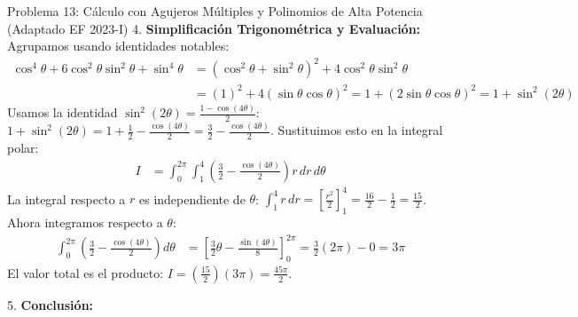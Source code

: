 \documentclass[11pt,a4paper]{article}
\begin{document}
\begin{ejerciciobox}{Problema 13: Cálculo con Agujeros Múltiples y Polinomios de Alta Potencia (Adaptado EF 2023-I)}
4. \textbf{Simplificación Trigonométrica y Evaluación:}
Agrupamos usando identidades notables:
\begin{align*}
\cos^4\theta + 6\cos^2\theta\sin^2\theta + \sin^4\theta &= (\cos^2\theta + \sin^2\theta)^2 + 4\cos^2\theta\sin^2\theta \\
&= (1)^2 + 4(\sin\theta\cos\theta)^2 = 1 + (2\sin\theta\cos\theta)^2 = 1 + \sin^2(2\theta)
\end{align*}
Usamos la identidad $\sin^2(2\theta) = \frac{1 - \cos(4\theta)}{2}$:
$1 + \sin^2(2\theta) = 1 + \frac{1}{2} - \frac{\cos(4\theta)}{2} = \frac{3}{2} - \frac{\cos(4\theta)}{2}$.
Sustituimos esto en la integral polar:
\begin{align*}
I &= \int_0^{2\pi} \int_1^4 \left( \frac{3}{2} - \frac{\cos(4\theta)}{2} \right) r \, dr \, d\theta
\end{align*}
La integral respecto a $r$ es independiente de $\theta$:
$\int_1^4 r \, dr = \left[ \frac{r^2}{2} \right]_1^4 = \frac{16}{2} - \frac{1}{2} = \frac{15}{2}$.
Ahora integramos respecto a $\theta$:
\begin{align*}
\int_0^{2\pi} \left( \frac{3}{2} - \frac{\cos(4\theta)}{2} \right) d\theta &= \left[ \frac{3}{2}\theta - \frac{\sin(4\theta)}{8} \right]_0^{2\pi} = \frac{3}{2}(2\pi) - 0 = 3\pi
\end{align*}
El valor total es el producto:
$I = \left(\frac{15}{2}\right) (3\pi) = \frac{45\pi}{2}$.

5. \textbf{Conclusión:}
\end{ejerciciobox}
\end{document}
